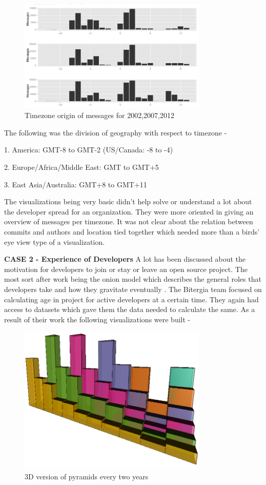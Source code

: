 \documentclass[double,12pt]{beavtex}
\begin{document}
\begin{figure}[!ht]
\centering
\includegraphics[width=90mm]{work2.png}
\caption{Timezone origin of messages for 2002,2007,2012}
\end{figure}

The following was the division of geography with respect to timezone -

1. America: GMT-8 to GMT-2 (US/Canada: -8 to -4)

2. Europe/Africa/Middle East: GMT to GMT+5

3. East Asia/Australia: GMT+8 to GMT+11


The visualizations being very basic didn't help solve or understand a lot about the developer spread for an organization. They were more oriented in giving an overview of messages per timezone. It was not clear about the relation between commits and authors and location tied together which needed more than a birds' eye view type of a visualization. 

\textbf{CASE 2 - Experience of Developers}
A lot has been discussed about the motivation for developers to join or stay or leave an open source project. The most sort after work being the onion model which describes the general roles that developers take and how they gravitate eventually \cite{crowston2005,  kishida2003}. The Bitergia team focused on calculating age in project for active developers at a certain time. They again had access to datasets which gave them the data needed to calculate the same. As a result of their work the following visualizations were built - 

\begin{figure}[!ht]
\centering
\includegraphics[width=90mm]{age2.png}
\caption{3D version of pyramids every two years}
\end{figure}
\end{document}
